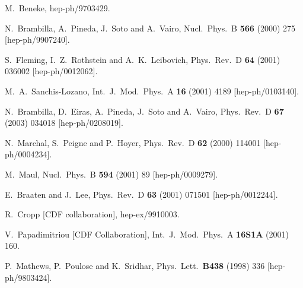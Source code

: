 \begin{thebibliography}{999}
M.~Beneke,
hep-ph/9703429.

N.~Brambilla, A.~Pineda, J.~Soto and A.~Vairo,
Nucl.\ Phys.\ B {\bf 566} (2000) 275
[hep-ph/9907240].

S.~Fleming, I.~Z.~Rothstein and A.~K.~Leibovich,
Phys.\ Rev.\ D {\bf 64} (2001) 036002 
[hep-ph/0012062].
 
M.~A.~Sanchis-Lozano,
Int.\ J.\ Mod.\ Phys.\ A {\bf 16} (2001) 4189 
[hep-ph/0103140].

N.~Brambilla, D.~Eiras, A.~Pineda, J.~Soto and A.~Vairo,
Phys.\ Rev.\ D {\bf 67} (2003) 034018
[hep-ph/0208019].

N.~Marchal, S.~Peigne and P.~Hoyer,
Phys.\ Rev.\ D {\bf 62} (2000) 114001
[hep-ph/0004234].
 
M.~Maul,
Nucl.\ Phys.\ B {\bf 594} (2001) 89
[hep-ph/0009279].

E.~Braaten and J.~Lee,
Phys.\ Rev.\ D {\bf 63} (2001) 071501
[hep-ph/0012244].

R.~Cropp  [CDF collaboration],
hep-ex/9910003.

V.~Papadimitriou  [CDF Collaboration],
Int.\ J.\ Mod.\ Phys.\ A {\bf 16S1A} (2001) 160.

P.~Mathews, P.~Poulose and K.~Sridhar,
Phys.\ Lett.\  {\bf B438} (1998) 336
[hep-ph/9803424].
 

\end{thebibliography}
